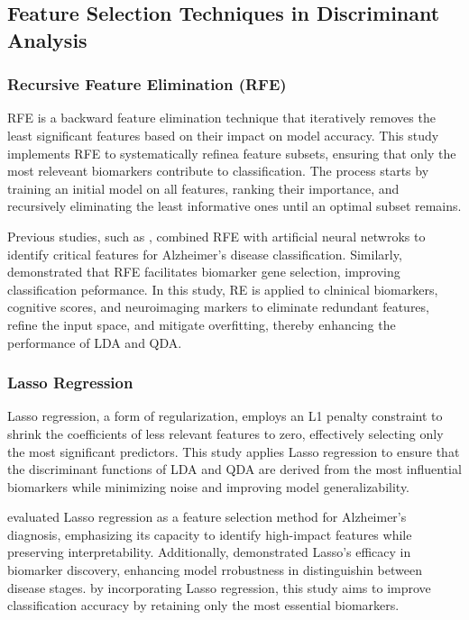 \documentclass[12pt]{article}
\begin{document}
\subsection{Feature Selection Techniques in Discriminant Analysis}
\subsubsection{Recursive Feature Elimination (RFE)}
\noindent

RFE is a backward feature elimination technique that iteratively removes the least significant features based on their impact on model accuracy. This study implements RFE to systematically refinea feature subsets, ensuring that only the most releveant biomarkers contribute to classification. The process starts by training an initial model on all features,
ranking their importance, and recursively eliminating the least informative ones until an optimal subset remains.

Previous studies, such as \cite{balakrishnan2020_rfe_ann_ad}, combined RFE with artificial neural netwroks to identify critical features for Alzheimer's disease classification. Similarly, \cite{alshamlan2018_biomarker_gene_selection} demonstrated that RFE facilitates biomarker gene selection, improving classification peformance. In this study, RE is applied
to clninical biomarkers, cognitive scores, and neuroimaging markers to eliminate redundant features, refine the input space, and mitigate overfitting, thereby enhancing the performance of LDA and QDA.

\subsubsection{Lasso Regression}
\noindent

Lasso regression, a form of regularization, employs an L1 penalty constraint to shrink the coefficients of less relevant features to zero, effectively selecting only the most significant predictors. This study applies Lasso regression to ensure that the discriminant functions of LDA and QDA are derived from the most influential biomarkers while minimizing
noise and improving model generalizability.

\cite{gu2020_feature_selection_ad} evaluated Lasso regression as a feature selection method for Alzheimer's diagnosis, emphasizing its capacity to identify high-impact features while preserving interpretability. Additionally, \cite{spooner2020_ensemble_feature_selection} demonstrated Lasso's efficacy in biomarker discovery, enhancing model rrobustness in
distinguishin between disease stages. by incorporating Lasso regression, this study aims to improve classification accuracy by retaining only the most essential biomarkers.
\end{document}
